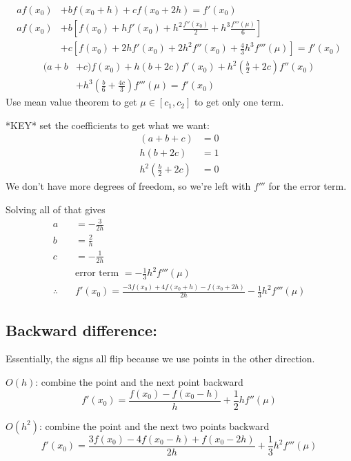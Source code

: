 \documentclass[12pt]{article}
\begin{document}
\begin{align*}
a f(x_0) &+ b f(x_0 + h) + c f(x_0 + 2h) = f'(x_0) \\
%
a f(x_0) &+ b[f(x_0) + hf'(x_0) + h^2\frac{f''(x_0)}{2} + h^3\frac{f'''(\mu)}{6}] \nonumber \\
&+ c[f(x_0) + 2h f'(x_0) + 2 h^2 f''(x_0) + \frac{4}{3} h^3 f'''(\mu)] =f'(x_0)
\end{align*}
\begin{align*}
(a + b &+ c)f(x_0) + h(b + 2c)f'(x_0) + h^2(\frac{b}{2} + 2c) f''(x_0) \nonumber \\
&+ h^3(\frac{b}{6} +  \frac{4c}{3}) f'''(\mu) = f'(x_0)
\end{align*}
%
Use mean value theorem to get $\mu \in [c_1, c_2]$ to get only one term.

*KEY* set the coefficients to get what we want:
%
\begin{align*}
(a + b + c) &= 0\\
h(b + 2c) &= 1\\
h^2(\frac{b}{2} + 2c) &= 0
\end{align*}
%
We don't have more degrees of freedom, so we're left with $f'''$ for the error term. 

Solving all of that gives
%
\begin{align*}
a &= -\frac{3}{2h} \\
b &= \frac{2}{h} \\
c &= -\frac{1}{2h} \\
&\text{error term } = -\frac{1}{3}h^2 f'''(\mu) \\
\therefore \quad &\boxed{f'(x_0) = \frac{-3 f(x_0) + 4f(x_0 + h) - f(x_0 + 2h)}{2h} -\frac{1}{3}h^2 f'''(\mu)}
\end{align*}


\subsection*{Backward difference:}
Essentially, the signs all flip because we use points in the other direction.

\underline{$O(h)$}: combine the point and the next point backward
\[f'(x_0) = \frac{f(x_0) - f(x_0 - h)}{h} + \frac{1}{2}hf''(\mu)\]

\underline{$O(h^2)$}: combine the point and the next two points backward
%
\[f'(x_0) = \frac{3 f(x_0) - 4f(x_0 - h) + f(x_0 - 2h)}{2h} + \frac{1}{3}h^2 f'''(\mu)\]

\end{document}
